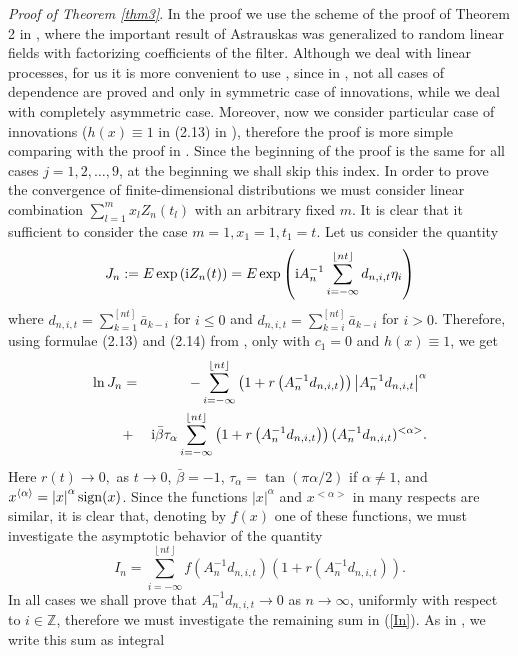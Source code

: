 \documentclass[12pt]{article}
\def\bz{{\bf Z}}
\def\bz{{\mathbb Z}} %
\def\a{\alpha}
\def\b{\beta}
\newcommand{\sign}{{\rm sign} }
\newcommand{\ri}{{\rm i} }
\newcommand{\abs}[1]{\left|#1\right|}
\newcommand{\sv}[1]{\left\lfloor #1 \right\rfloor}
\theoremstyle{plain}
\theoremstyle{definition}
\begin{document}
{\it Proof of Theorem \ref{thm3}}. In the proof we use the scheme of the proof of Theorem 2 in \cite{PaulDam5}, where the important result of Astrauskas \cite{Astrauskas} was generalized to random linear fields with factorizing coefficients of the filter. Although we deal with linear processes, for us it is more convenient to use \cite{PaulDam5}, since in \cite{Astrauskas}, not all cases of dependence are proved and only in symmetric case of innovations, while we deal with completely asymmetric case. Moreover, now we consider particular case of innovations ($h(x)\equiv 1$ in (2.13) in \cite{PaulDam5}), therefore the proof is more simple comparing with the proof in \cite{PaulDam5}. Since the beginning of the proof is the same for all cases  $j=1, 2, \dots, 9$, at the beginning we shall skip this index. In order to prove the convergence of finite-dimensional distributions we must consider linear combination $\sum_{l=1}^m x_lZ_n(t_l)$ with an arbitrary fixed $m$. It is clear that it sufficient to consider the case $m=1, x_1=1, t_1= t.$ Let us consider the quantity
$$
 J_n :=E \exp\left( \ri  Z_{n}(t) \right)= E \exp\left( \ri  A_{n}^{-1} \sum_{i=-\infty}^{\sv{nt}}d_{n, i, t}\eta_{i} \right)
$$
where  $d_{n,i,t}=\sum_{k=1}^{[nt]}{\bar a}_{k-i}$ for $i\le 0$ and $d_{n,i,t}=\sum_{k=i}^{[nt]}{\bar a}_{k-i}$ for $i> 0$. Therefore, using formulae (2.13) and (2.14) from \cite{PaulDam5}, only with $c_1=0$ and $h(x)\equiv 1$, we get
\begin{eqnarray}\label{lnJn}
\ln  J_n &=& -\sum_{i=-\infty}^{\sv{nt}}\left( 1+r\left( A_{n}^{-1}d_{n, i, t}  \right) \right)\abs{ A_{n}^{-1}d_{n, i, t} }^\a \\ \nonumber
    &+& \ri{\bar \b}\tau_\a\sum_{i=-\infty}^{\sv{nt}}\left( 1+r\left( A_{n}^{-1}d_{n, i, t}  \right)  \right)(A_{n}^{-1}d_{n, i, t})^{<\a>}.
\end{eqnarray}
Here  $r(t)\rightarrow 0,$ as $ t\rightarrow 0$, ${\bar \b}=-1$, $\tau_\a=\tan\left( {\pi\a}/{2} \right)$ if $\a\neq 1$, and $x^{\langle\a\rangle}=\abs{x}^\a\sign (x)$. Since the functions $|x|^\a$ and $x^{<\a>}$ in many respects are similar, it is clear that, denoting by $f(x)$ one of these functions, we must investigate the asymptotic behavior of the quantity
\begin{equation}\label{In}
 I_n=\sum_{i=-\infty}^{\sv{nt}}f\left( A_{n}^{-1}d_{n, i, t}  \right) \left( 1+r\left( A_{n}^{-1}d_{n, i, t}  \right) \right).
\end{equation}
In all cases we shall prove that $ A_{n}^{-1}d_{n, i, t} \to 0$ as $n\to \infty$, uniformly with respect to $i\in \bz$, therefore we must investigate the remaining sum in (\ref{In}). As in \cite{PaulDam5}, we write this sum as integral
\end{document}

